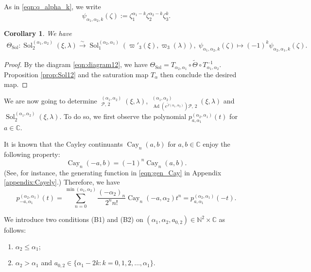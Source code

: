 \documentclass[a4paper,11pt,reqno]{amsart}
\newcommand{\calP}{\mathcal{P}}
\newcommand{\0}{{\bf 0}}
\newcommand{\N}{\mathbb{N}}
\newcommand{\C}{\mathbb{C}}
\newcommand{\1}{{\bf 1}}
\DeclareMathOperator{\Cay}{Cay}
\DeclareMathOperator{\Ad}{Ad}
\DeclareMathOperator{\Sol}{Sol}
\newcommand{\wJ}{\widetilde{J}}
\DeclareMathOperator{\To}{\longrightarrow}
\DeclareMathOperator{\wSol}{\widetilde{\Sol}}
\theoremstyle{plain}
\newtheorem{corollary}[equation]{Corollary}
\theoremstyle{definition}
\numberwithin{equation}{section}
\theoremstyle{definition}
\begin{document}
As in \eqref{eqn:q_alpha_k}, we write
\begin{equation*}
\psi_{\alpha_1,\alpha_2,k}(\zeta) := \zeta_1^{\alpha_1-k}\zeta_2^{\alpha_2-k}\zeta_3^k.
\end{equation*}

\begin{corollary}\label{cor:duality}
We have 
\begin{align*}
\Theta_{\Sol}\colon
\Sol^{(\alpha_1,\alpha_2)}_2(\xi,\lambda) 
\stackrel{\sim}{\To} 
\Sol^{(\alpha_2,\alpha_1)}_1(\varpi'_3(\xi),\varpi_3(\lambda)),
    \;
    \psi_{\alpha_1,\alpha_2,k}(\zeta) \mapsto (-1)^k \psi_{\alpha_2,\alpha_1,k}(\zeta).
\end{align*}
\end{corollary}

\begin{proof}
By the diagram \eqref{eqn:diagram12}, we have 
$\Theta_{\Sol}=T_{\alpha_2,\alpha_1} \circ \widetilde{\Theta} \circ T^{-1}_{\alpha_1,\alpha_2}$.
Proposition \ref{prop:Sol12} and the saturation map $T_\alpha$ then conclude
the desired map.
\end{proof}

We are now going to determine 
$\wSol_{\calP,\, 2}^{(\alpha_1,\alpha_2)}(\xi,\lambda)$, 
$\wSol_{\Ad(e^{\wJ(\alpha_1,\alpha_2)}) \calP,\, 2}^{(\alpha_1,\alpha_2)}(\xi,\lambda)$
and
$\Sol^{(\alpha_1,\alpha_2)}_2(\xi,\lambda)$.
To do so, we first observe the polynomial 
$p_{a,\alpha_1}^{(\alpha_2,\alpha_1)}(t)$ for $a \in \C$.

It is known that the Cayley continuants $\Cay_n(a,b)$ for $a,b\in \C$ 
enjoy the following property:
\begin{equation*}
\Cay_n(-a,b)=(-1)^n\Cay_n(a,b).
\end{equation*}
(See, for instance, the generating function in \eqref{eqn:gen_Cay} 
in Appendix \ref{appendix:Cayely}.)
Therefore, we have
\begin{equation}\label{eqn:polynomial_p}
p_{-a,\alpha_1}^{(\alpha_2,\alpha_1)}(t) = 
\sum_{n=0}^{\min(\alpha_1,\alpha_2)} 
\frac{(-\alpha_2)_n}{2^n n! }\Cay_n(-a,\alpha_2)t^n
=p_{a,\alpha_1}^{(\alpha_2,\alpha_1)}(-t).
\end{equation}

We introduce two conditions 
 (B1) and (B2) on $(\alpha_1, \alpha_2, a_{0,2}) \in \N^2 \times \C$ as follows:
\vspace{5pt}
\begin{enumerate}[label=\normalfont{(\arabic*)}]
\item[(B1)] $\alpha_2\leq \alpha_1$;
\vspace{5pt}
\item[(B2)] $\alpha_2>\alpha_1$ and 
$a_{0,2}\in \{\alpha_1 - 2k: k=0,1,2,\ldots, \alpha_1\}$.
\end{enumerate}
\end{document}
